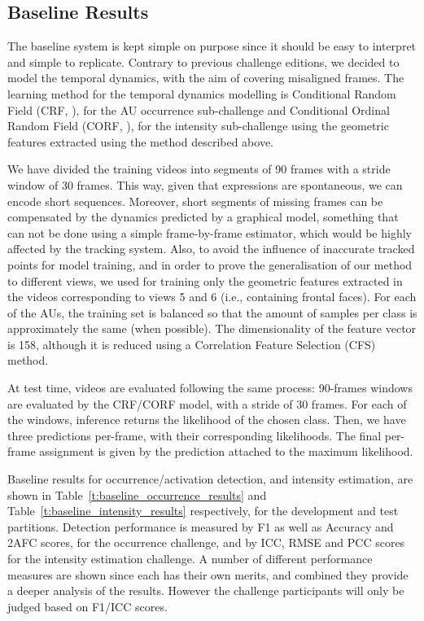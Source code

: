 \documentclass[a4paper, 10pt, conference]{ieeeconf}      \usepackage{FG2017}
\begin{document}
\subsection{Baseline Results}
\label{ssec:baseline_results}
\noindent The baseline system is kept simple on purpose since it should be easy to interpret and simple to replicate. Contrary to previous challenge editions, we decided to model the temporal dynamics, with the aim of covering misaligned frames. The learning method for the temporal dynamics modelling is Conditional Random Field (CRF, \cite{lafferty01}), for the AU occurrence sub-challenge and Conditional Ordinal Random Field (CORF, \cite{kim10}), for the intensity sub-challenge using the geometric features extracted using the method described above. 

We have divided the training videos into segments of 90 frames with a stride window of 30 frames. This way, given that expressions are spontaneous, we can encode short sequences. Moreover, short segments of missing frames can be compensated by the dynamics predicted by a graphical model, something that can not be done using a simple frame-by-frame estimator, which would be highly affected by the tracking system. Also, to avoid the influence of inaccurate tracked points for model training, and in order to prove the generalisation of our method to different views, we used for training only the geometric features extracted in the videos corresponding to views 5 and 6 (i.e., containing frontal faces). For each of the AUs, the training set is balanced so that the amount of samples per class is approximately the same (when possible). The dimensionality of the feature vector is 158, although it is reduced using a Correlation Feature Selection (CFS) method.

At test time, videos are evaluated following the same process: 90-frames windows are evaluated by the CRF/CORF model, with a stride of 30 frames. For each of the windows, inference returns the likelihood of the chosen class. Then, we have three predictions per-frame, with their corresponding likelihoods. The final per-frame assignment is given by the prediction attached to the maximum likelihood. 

Baseline results for occurrence/activation detection, and intensity estimation, are shown in Table~\ref{t:baseline_occurrence_results} and Table~\ref{t:baseline_intensity_results} respectively, for the development and test partitions. Detection performance is measured by F1 as well as Accuracy and 2AFC scores, for the occurrence challenge, and by ICC, RMSE and PCC scores for the intensity estimation challenge. A number of different performance measures are shown since each has their own merits, and combined they provide a deeper analysis of the results. However the challenge participants will only be judged based on F1/ICC scores. 
\end{document}
